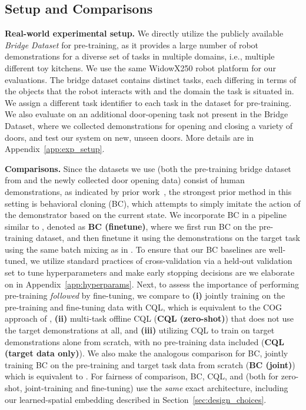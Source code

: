 \vspace{-0.2cm}
\subsection{Setup and Comparisons}
\vspace{-0.2cm}
\textbf{Real-world experimental setup.} We directly utilize the publicly available \emph{Bridge Dataset}
\cite{ebert2021bridge} for pre-training, as it provides a large number of robot demonstrations for a diverse set of tasks in multiple domains, i.e., multiple different toy kitchens. We use the same WidowX250 robot platform for our evaluations. The bridge dataset contains distinct tasks, each differing in terms of the objects that the robot interacts with and the domain the task is situated in. We assign a different task identifier to each task in the dataset for pre-training. We also evaluate on an additional door-opening task not present in the Bridge Dataset, where we collected demonstrations for opening and closing a variety of doors, and test our system on new, unseen doors. {More details are in Appendix~\ref{app:exp_setup}.} 

\textbf{Comparisons.} Since the datasets we use (both the pre-training bridge dataset from \citep{ebert2021bridge} and the newly collected door opening data) consist of human demonstrations, as indicated by prior work~\citep{mandlekar2021what}, the strongest prior method in this setting is behavioral cloning (BC), which attempts to simply imitate the action of the demonstrator based on the current state. We incorporate BC in a pipeline similar to \ptrmethodname, denoted as \textbf{BC (finetune)}, where we first run BC on the pre-training dataset, and then finetune it using the demonstrations on the target task using the same batch mixing as in \ptrmethodname. To ensure that our BC baselines are well-tuned, we utilize standard practices of cross-validation via a held-out validation set to tune hyperparameters and make early stopping decisions are we elaborate on in {Appendix~\ref{app:hyperparams}}.
Next, to assess the importance of performing pre-training \emph{followed} by fine-tuning, we compare \ptrmethodname to \textbf{(i)} jointly training on the pre-training and fine-tuning data with CQL, which is equivalent to the COG approach of \citet{singh2020cog},
\textbf{(ii)} multi-task offline CQL (\textbf{CQL (zero-shot)}) that does not use the target demonstrations at all, and \textbf{(iii)} utilizing CQL to train on target demonstrations alone from scratch, with no pre-training data included (\textbf{CQL (target data only)}). We also make the analogous comparison for BC, jointly training BC on the pre-training and target task data from scratch (\textbf{BC (joint)}) which is equivalent to \citep{ebert2021bridge}. For fairness of comparison, BC, CQL, and \ptrmethodname (both for zero-shot, joint-training and fine-tuning) use the \emph{same} exact architecture, including our learned-spatial embedding described in Section~\ref{sec:design_choices}.

